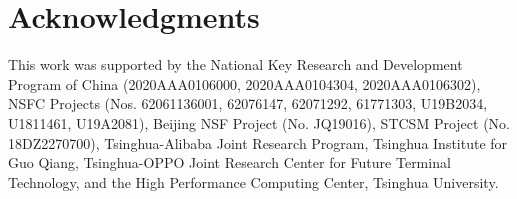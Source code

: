 \documentclass[times,twocolumn,final,authoryear]{elsarticle}
\begin{document}

\section*{Acknowledgments}

This work was supported by the National Key Research and Development Program of China (2020AAA0106000, 2020AAA0104304, 2020AAA0106302), NSFC Projects (Nos. 62061136001, 62076147, 62071292, 61771303, U19B2034, U1811461, U19A2081), Beijing NSF Project (No. JQ19016), STCSM Project (No. 18DZ2270700), Tsinghua-Alibaba Joint Research Program, Tsinghua Institute for Guo Qiang, Tsinghua-OPPO Joint Research Center for Future Terminal Technology, and the High Performance Computing Center, Tsinghua University.




\end{document}
